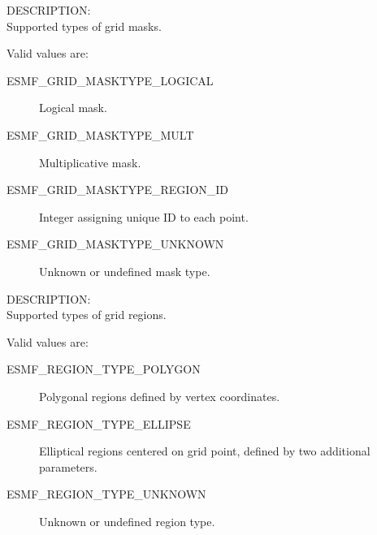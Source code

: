 {\sf DESCRIPTION:\\}
Supported types of grid masks.

Valid values are:
\begin{description}
   \item [ESMF\_GRID\_MASKTYPE\_LOGICAL]
         Logical mask.
   \item [ESMF\_GRID\_MASKTYPE\_MULT]
         Multiplicative mask.
   \item [ESMF\_GRID\_MASKTYPE\_REGION\_ID]
         Integer assigning unique ID to each point.
   \item [ESMF\_GRID\_MASKTYPE\_UNKNOWN]
         Unknown or undefined mask type.
\end{description}


{\sf DESCRIPTION:\\}
Supported types of grid regions.

Valid values are:
\begin{description}
   \item [ESMF\_REGION\_TYPE\_POLYGON]
         Polygonal regions defined by vertex coordinates.
   \item [ESMF\_REGION\_TYPE\_ELLIPSE]
         Elliptical regions centered on grid point, defined by two 
         additional parameters.
   \item [ESMF\_REGION\_TYPE\_UNKNOWN]
         Unknown or undefined region type.
\end{description}
